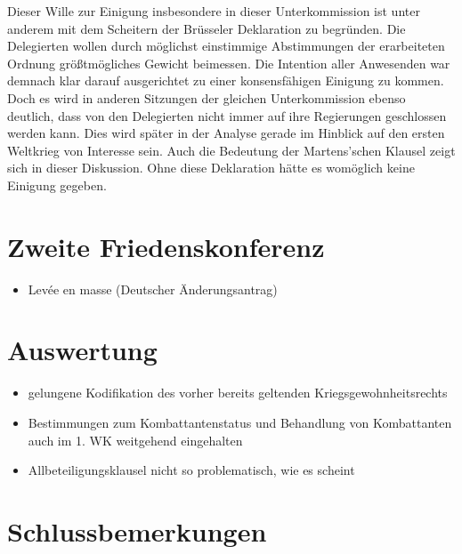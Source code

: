 \documentclass[12pt]{scrartcl}
\begin{document}
Dieser Wille zur Einigung insbesondere in dieser Unterkommission ist unter anderem mit dem Scheitern der Brüsseler Deklaration zu begründen. Die Delegierten wollen durch möglichst einstimmige Abstimmungen der erarbeiteten Ordnung größtmögliches Gewicht beimessen. Die Intention aller Anwesenden war demnach klar darauf ausgerichtet zu einer konsensfähigen Einigung zu kommen. Doch es wird in anderen Sitzungen der gleichen Unterkommission ebenso deutlich, dass von den Delegierten nicht immer auf ihre Regierungen geschlossen werden kann. Dies wird später in der Analyse gerade im Hinblick auf den ersten Weltkrieg von Interesse sein. Auch die Bedeutung der Martens'schen Klausel zeigt sich in dieser Diskussion. Ohne diese Deklaration hätte es womöglich keine Einigung gegeben.

\section{Zweite Friedenskonferenz}
\begin{itemize}
	\item Levée en masse (Deutscher Änderungsantrag)
\end{itemize}
\section{Auswertung}
\begin{itemize}
	\item gelungene Kodifikation des vorher bereits geltenden Kriegsgewohnheitsrechts
	\item Bestimmungen zum Kombattantenstatus und Behandlung von Kombattanten auch im 1. WK weitgehend eingehalten
	\item Allbeteiligungsklausel nicht so problematisch, wie es scheint
\end{itemize}
\cite{Gasser1991}
\cite{Lingen2014}
\cite{Fraenkel1968}
\cite{Heffter1951}
\cite{DeutschesReich2010}
\cite{Scott1921}



\section{Schlussbemerkungen}


\newpage

\printbibliography
{}


\newpage
{}
\end{document}

